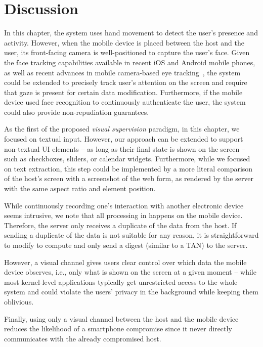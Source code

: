 
\section{Discussion} 
\label{integriscreen:sec:discussion}


In this chapter, the system uses hand movement to detect the user's presence and activity.
However, when the mobile device is placed between the host and the user, its front-facing camera is well-positioned to capture the user's face.
Given the face tracking capabilities available in recent iOS and Android mobile phones, as well as recent advances in mobile camera-based eye tracking~\cite{krafka2016eye}, the system could be extended to precisely track user's attention on the screen and require that gaze is present for certain data modification.
Furthermore, if the mobile device used face recognition to continuously authenticate the user, the system could also provide non-repudiation guarantees.


As the first of the proposed \textit{visual supervision} paradigm, in this chapter, we focused on textual input.
However, our approach can be extended to support non-textual UI elements -- as long as their final state is shown on the screen -- such as checkboxes, sliders, or calendar widgets.
Furthermore, while we focused on text extraction, this step could be implemented by a more literal comparison of the host's screen with a screenshot of the web form, as rendered by the server with the same aspect ratio and element position.

While continuously recording one's interaction with another electronic device seems intrusive, we note that all processing in \sysname happens on the mobile device.
Therefore, the server only receives a duplicate of the data from the host.
If sending a duplicate of the data is not suitable for any reason, it is straightforward to modify \name to compute and only send a digest (similar to a TAN) to the server.

However, a visual channel gives users clear control over which data the mobile device observes, i.e., only what is shown on the screen at a given moment -- while most kernel-level applications typically get unrestricted access to the whole system and could violate the users' privacy in the background while keeping them oblivious.

Finally, using only a visual channel between the host and the mobile device reduces the likelihood of a smartphone compromise since it never directly communicates with the already compromised host.